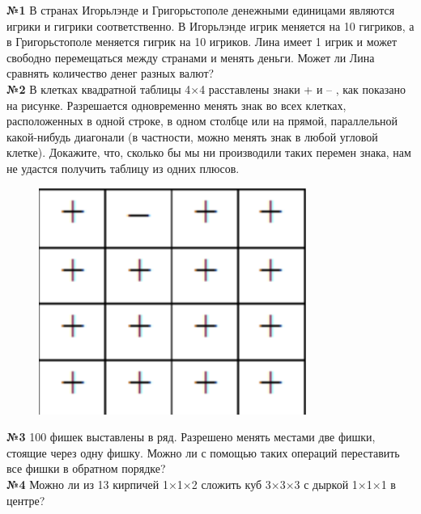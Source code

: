 \documentclass[12 pt, a4paper]{article}%
\newcommand{\task}[1]{{{\vspace{0.6cm} \vspace{-2ex} \textbf{№{#1}}  }}}
\begin{document}
	\large
	\raggedright
	\task{1} В странах Игорьлэнде и Григорьстополе денежными единицами являются игрики и гигрики соответственно. В Игорьлэнде игрик меняется на 10 гигриков, а в Григорьстополе  меняется гигрик на 10 игриков. Лина имеет 1 игрик и может свободно перемещаться между странами и менять деньги. Может ли Лина сравнять количество денег разных валют?\\
	\task{2} В клетках квадратной таблицы 4×4 расставлены знаки  +  и  – ,   как показано на рисунке. Разрешается одновременно менять знак во всех клетках, расположенных в одной строке, в одном столбце или на прямой, параллельной какой-нибудь диагонали (в частности, можно менять знак в любой угловой клетке). Докажите, что, сколько бы мы ни производили таких перемен знака, нам не удастся получить таблицу из одних плюсов.	\\
	\begin{center}
		\begin{figure}[h]
			\centering
			\includegraphics[width=0.2\linewidth]{task1.png}
		\end{figure}
	\end{center}
	\vspace{-6ex}
	\task{3}100 фишек выставлены в ряд. Разрешено менять местами две фишки, стоящие через одну фишку.
	Можно ли с помощью таких операций переставить все фишки в обратном порядке?\\
	
	\task{4}Можно ли из 13 кирпичей 1×1×2 сложить куб 3×3×3 с дыркой 1×1×1 в центре?
	
\end{document}
